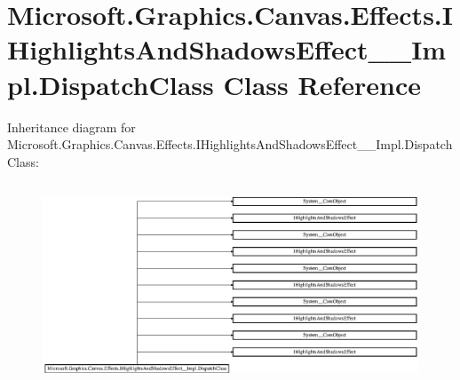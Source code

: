 \hypertarget{class_microsoft_1_1_graphics_1_1_canvas_1_1_effects_1_1_i_highlights_and_shadows_effect_____impl_1_1_dispatch_class}{}\section{Microsoft.\+Graphics.\+Canvas.\+Effects.\+I\+Highlights\+And\+Shadows\+Effect\+\_\+\+\_\+\+Impl.\+Dispatch\+Class Class Reference}
\label{class_microsoft_1_1_graphics_1_1_canvas_1_1_effects_1_1_i_highlights_and_shadows_effect_____impl_1_1_dispatch_class}
Inheritance diagram for Microsoft.\+Graphics.\+Canvas.\+Effects.\+I\+Highlights\+And\+Shadows\+Effect\+\_\+\+\_\+\+Impl.\+Dispatch\+Class\+:\begin{figure}[H]
\begin{center}
\leavevmode
\includegraphics[height=6.074950cm]{class_microsoft_1_1_graphics_1_1_canvas_1_1_effects_1_1_i_highlights_and_shadows_effect_____impl_1_1_dispatch_class}
\end{center}
\end{figure}
